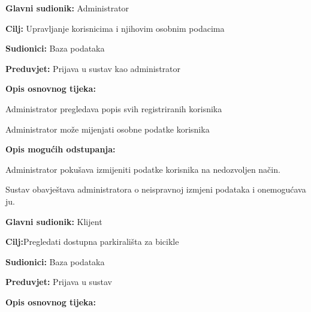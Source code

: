 {\begin{packed_item}
\begin{packed_enum}
	\end{packed_enum}
	
\end{packed_item}

\noindent {}
\begin{packed_item}
	
	\item \textbf{Glavni sudionik: }Administrator
	\item  \textbf{Cilj:} Upravljanje korisnicima i njihovim osobnim podacima
	\item  \textbf{Sudionici:} Baza podataka
	\item  \textbf{Preduvjet:} Prijava u sustav kao administrator
	\item  \textbf{Opis osnovnog tijeka:}
	
	\item[] \begin{packed_enum}
		
		\item Administrator pregledava popis svih registriranih korisnika
		\item Administrator može mijenjati osobne podatke korisnika
		
	\end{packed_enum}
	
	\item  \textbf{Opis mogućih odstupanja:}
	
	\item[] \begin{packed_item}
		
		\item[2.a] Administrator pokušava izmijeniti podatke korisnika na nedozvoljen način.
		\item[] \begin{packed_enum}
			
			\item Sustav obavještava administratora o neispravnoj izmjeni podataka i onemogućava ju.
			
		\end{packed_enum}
		
	\end{packed_item}
	
\end{packed_item}
\newpage
\noindent {}
\begin{packed_item}
	
	\item \textbf{Glavni sudionik: }Klijent
	\item  \textbf{Cilj:}Pregledati dostupna parkirališta za bicikle
	\item  \textbf{Sudionici:} Baza podataka
	\item  \textbf{Preduvjet:} Prijava u sustav
	\item  \textbf{Opis osnovnog tijeka:}
	

\end{packed_item}}
